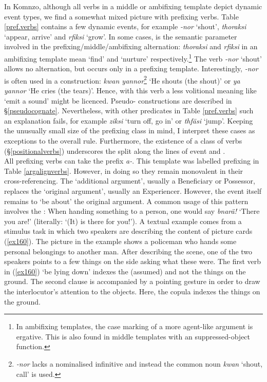 In Komnzo, although all verbs in a middle or ambifixing template depict dynamic event types, we find a somewhat mixed picture with prefixing verbs. Table \ref{pref.verbs} contains a few dynamic events, for example \emph{-nor} `shout', \emph{thoraksi} `appear, arrive' and \emph{rfiksi} `grow'. In some cases,  is the semantic parameter involved in the prefixing/middle/ambifixing alternation: \emph{thoraksi} and \emph{rfiksi} in an ambifixing  template mean `find' and `nurture' respectively.\footnote{In ambifixing templates, the case marking of a more agent-like argument is ergative. This is also found in middle templates with an suppressed-object function.} The verb \emph{-nor} `shout' allows no alternation, but occurs only in a prefixing template. Interestingly, \emph{-nor} is often used in a  construction: \emph{kwan yannor}\footnote{\emph{-nor} lacks a nominalised infinitive and instead the common noun \emph{kwan} `shout, call' is used.} `He shouts (the shout)' or \emph{ya yannor} `He cries (the tears)'. Hence, with this verb a less volitional meaning like `emit a sound' might be licenced. Pseudo- constructions are described in \S{}\ref{pseudocognate}. Nevertheless, with other predicates in Table \ref{pref.verbs} such an explanation fails, for example \emph{ziksi} `turn off, go in' or \emph{thfäsi} `jump'. Keeping the unusually small size of the prefixing class in mind, I interpret these cases as exceptions to the overall rule. Furthermore, the existence of a class of  verbs (\S{}\ref{positionalverbs}) underscores the split along the lines of event  and .\\

All prefixing verbs can take the  prefix \emph{a-}. This template was labelled  prefixing in Table \ref{argalignverbs}. However, in doing so they remain monovalent in their cross-referencing. The `additional argument', usually a Beneficiary or Possessor, replaces the `original argument', usually an Experiencer. However, the event itself remains to `be about' the original argument. A common usage of this pattern involves the : When handing something to a person, one would say \emph{bnarä!} `There you are!' (literally: `(It) is there for you!'). A textual example comes from a stimulus task in which two speakers are describing the content of picture cards (\ref{ex160}). The picture in the example shows a policeman who hands some personal belongings to another man. After describing the scene, one of the two speakers points to a few things on the side asking what these were. The first verb in (\ref{ex160}) `be lying down' indexes the (assumed)  and not the things on the ground. The second clause is accompanied by a pointing gesture in order to draw the interlocutor's attention to the objects. Here, the copula indexes the things on the ground.

